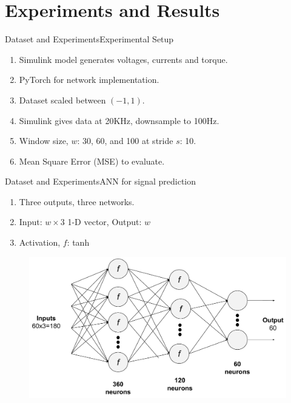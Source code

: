\documentclass[handout]{beamer}
\begin{document}
\section{Experiments and Results}
\begin{frame}{Dataset and Experiments}{Experimental Setup}
  \begin{enumerate}
    \item Simulink model generates voltages, currents and torque.
    \item PyTorch for network implementation.
    \item Dataset scaled between $(-1,1)$.
    \item Simulink gives data at 20KHz, downsample to 100Hz.
    \item Window size, $w$: 30, 60, and 100 at stride $s$: 10.
    \item Mean Square Error (MSE) to evaluate.
  \end{enumerate}
\end{frame}

\begin{frame}{Dataset and Experiments}{ANN for signal prediction}
  \begin{enumerate}
    \item Three outputs, three networks.
    \item Input: $w\times3$ 1-D vector, Output: $w$
    \item Activation, $f$: tanh
  \end{enumerate}
  \begin{center}
    \begin{figure}
    \includegraphics[scale=0.35]{images/motor_ann}
    \end{figure}
  \end{center}
\end{frame}
\end{document}

